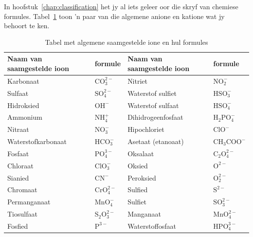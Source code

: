 In hoofstuk~\ref{chap:classification} het jy al iets geleer oor die skryf van chemiese formules. Tabel~\ref{tab:ions} toon 'n paar van die algemene anione en katione wat jy behoort te ken.
          \begin{table}[H]
        \begin{center}
      \label{m38689*uid99}
    \noindent
      \begin{tabular}{|l|l|l|l|}\hline
                  \textbf{Naam van saamgestelde ioon} &
                  \textbf{formule} &  \textbf{Naam van saamgestelde ioon} & \textbf{formule} \\ \hline
        Karbonaat & $\mathrm{CO}_{3}^{2-}$ & Nitriet & $\mathrm{NO}_{2}^{-}$ \\ \hline
        Sulfaat &  $\mathrm{SO}_{4}^{2-}$ & Waterstof sulfiet & $\mathrm{HSO}_{3}^{-}$ \\ \hline
        Hidroksied & ${\mathrm{OH}}^{-}$ & Waterstof sulfaat & $\mathrm{HSO}_{4}^{-}$ \\ \hline
        Ammonium & $\mathrm{NH}_{4}^{+}$ & Dihidrogeenfosfaat & ${\mathrm{H}}_{2}\mathrm{PO}_{4}^{-}$ \\ \hline
        Nitraat & $\mathrm{NO}_{3}^{-}$ & Hipochloriet & ${\mathrm{ClO}}^{-}$ \\ \hline
        Waterstofkarbonaat & $\mathrm{HCO}_{3}^{-}$ & Asetaat (etanoaat)  & ${\mathrm{CH}}_{3}{\mathrm{COO}}^{-}$ \\ \hline
        Fosfaat & $\mathrm{PO}_{4}^{3-}$ & Oksalaat & ${\mathrm{C}}_{2}\mathrm{O}_{4}^{2-}$ \\ \hline
        Chloraat & $\mathrm{ClO}_{3}^{-}$ &  Oksied & ${\mathrm{O}}^{2-}$ \\ \hline
        Sianied & ${\mathrm{CN}}^{-}$ & Peroksied & $\mathrm{O}_{2}^{2-}$ \\ \hline
        Chromaat & $\mathrm{CrO}_{4}^{2-}$ & Sulfied & ${\mathrm{S}}^{2-}$ \\ \hline
        Permanganaat & $\mathrm{MnO}_{4}^{-}$ & Sulfiet & $\mathrm{SO}_{3}^{2-}$ \\ \hline
        Tiosulfaat & ${\mathrm{S}}_{2}\mathrm{O}_{3}^{2-}$ & Manganaat & $\mathrm{MnO}_{4}^{2-}$ \\ \hline
        Fosfied & ${\mathrm{P}}^{3-}$ & Waterstoffosfaat & $\mathrm{HPO}_{4}^{3-}$ \\ \hline
    \end{tabular}
      \end{center}
    \caption{Tabel met algemene saamgestelde ione en hul formules}
\label{tab:ions}
\end{table}
    \par
	\par

